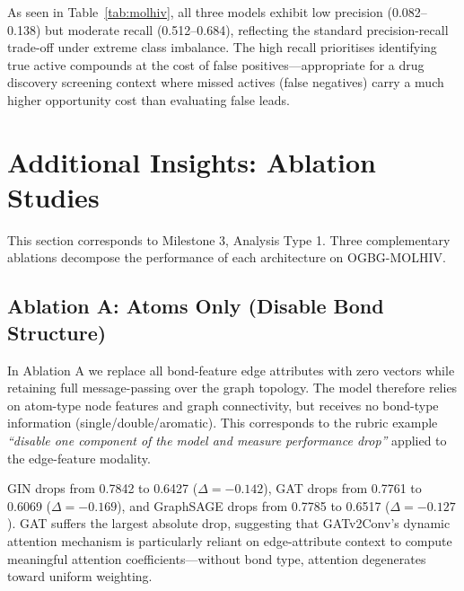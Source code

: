 \documentclass[conference]{IEEEtran}
\begin{document}
As seen in Table~\ref{tab:molhiv}, all three models exhibit low precision (0.082--0.138) but moderate recall (0.512--0.684), reflecting the standard precision-recall trade-off under extreme class imbalance. The high recall prioritises identifying true active compounds at the cost of false positives---appropriate for a drug discovery screening context where missed actives (false negatives) carry a much higher opportunity cost than evaluating false leads.

\section{Additional Insights: Ablation Studies}

This section corresponds to Milestone 3, Analysis Type 1. Three complementary ablations decompose the performance of each architecture on OGBG-MOLHIV.

\subsection{Ablation A: Atoms Only (Disable Bond Structure)}

In Ablation A we replace all bond-feature edge attributes with zero vectors while retaining full message-passing over the graph topology. The model therefore relies on atom-type node features and graph connectivity, but receives no bond-type information (single/double/aromatic). This corresponds to the rubric example \emph{``disable one component of the model and measure performance drop''} applied to the edge-feature modality.

GIN drops from 0.7842 to 0.6427 ($\Delta = -0.142$), GAT drops from 0.7761 to 0.6069 ($\Delta = -0.169$), and GraphSAGE drops from 0.7785 to 0.6517 ($\Delta = -0.127$). GAT suffers the largest absolute drop, suggesting that GATv2Conv's dynamic attention mechanism is particularly reliant on edge-attribute context to compute meaningful attention coefficients---without bond type, attention degenerates toward uniform weighting.
\end{document}
